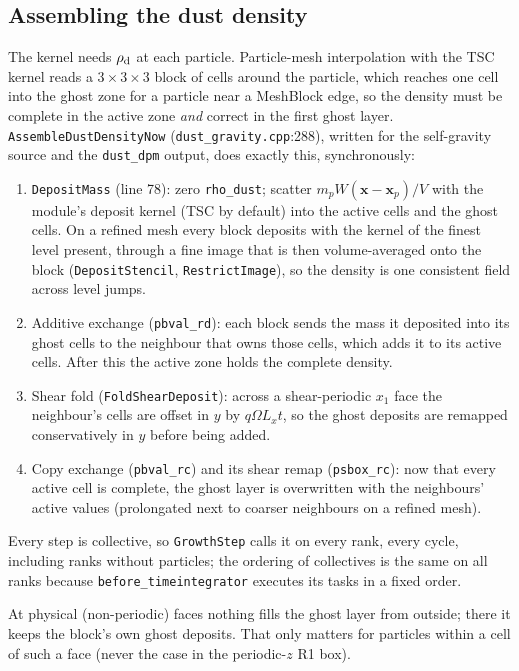 \documentclass[11pt]{article}
\newcommand{\code}[1]{\texttt{#1}}
\newcommand{\file}[1]{\texttt{\small #1}}
\newcommand{\fn}[1]{\texttt{\small #1}}
\newcommand{\rhod}{\rho_{\rm d}}
\begin{document}
\subsection{Assembling the dust density}
The kernel needs $\rhod$ at each particle. Particle-mesh interpolation with the TSC
kernel reads a $3\times3\times3$ block of cells around the particle, which reaches one
cell into the ghost zone for a particle near a MeshBlock edge, so the density must be
complete in the active zone \emph{and} correct in the first ghost layer.
\fn{AssembleDustDensityNow} (\file{dust\_gravity.cpp}:288), written for the
self-gravity source and the \code{dust\_dpm} output, does exactly this, synchronously:
\begin{enumerate}
\item \fn{DepositMass} (line 78): zero \code{rho\_dust}; scatter
  $m_pW(\mathbf x-\mathbf x_p)/V$ with the module's deposit kernel (TSC by default) into
  the active cells and the ghost cells. On a refined mesh every block deposits with the
  kernel of the finest level present, through a fine image that is then volume-averaged
  onto the block (\fn{DepositStencil}, \fn{RestrictImage}), so the density is one
  consistent field across level jumps.
\item Additive exchange (\code{pbval\_rd}): each block sends the mass it deposited into
  its ghost cells to the neighbour that owns those cells, which adds it to its active
  cells. After this the active zone holds the complete density.
\item Shear fold (\fn{FoldShearDeposit}): across a shear-periodic $x_1$ face the
  neighbour's cells are offset in $y$ by $q\Omega L_xt$, so the ghost deposits are
  remapped conservatively in $y$ before being added.
\item Copy exchange (\code{pbval\_rc}) and its shear remap (\code{psbox\_rc}): now that
  every active cell is complete, the ghost layer is overwritten with the neighbours'
  active values (prolongated next to coarser neighbours on a refined mesh).
\end{enumerate}
Every step is collective, so \fn{GrowthStep} calls it on every rank, every cycle,
including ranks without particles; the ordering of collectives is the same on all ranks
because \code{before\_timeintegrator} executes its tasks in a fixed order.

At physical (non-periodic) faces nothing fills the ghost layer from outside; there it
keeps the block's own ghost deposits. That only matters for particles within a cell of
such a face (never the case in the periodic-$z$ R1 box).
\end{document}
